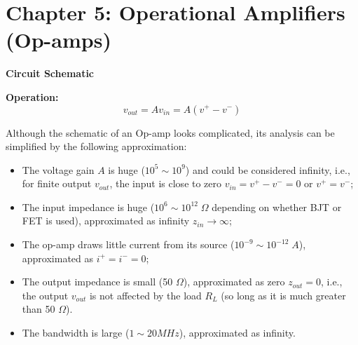 \usepackage{html}
\textwidth 6.0in
\topmargin -0.5in
\oddsidemargin -0in
\evensidemargin -0.5in


\section*{Chapter 5: Operational Amplifiers (Op-amps)}

{\bf Circuit Schematic}


{\bf Operation:}	
\[	v_{out}=A v_{in}=A (v^+ - v^-)	\]

Although the schematic of an Op-amp looks complicated, its 
analysis can be simplified by the following approximation:
\begin{itemize}
\item The voltage gain $A$ is huge ($10^5 \sim 10^9$) and could be considered
	infinity, i.e., for finite output $v_{out}$, the input is
	close to zero $v_{in}=v^+ - v^-=0$ or $v^+=v^-$;
\item The input impedance is huge ($10^6\sim 10^{12} \;\Omega$ depending
	on whether BJT or FET is used), approximated as infinity 
	$z_{in}\rightarrow \infty$;
\item The op-amp draws little current from its source 
	($10^{-9}\sim10^{-12}\;A$), approximated as $i^+=i^-=0$;
\item The output impedance is small (50 $\Omega$), approximated as 
	zero $z_{out}=0$, i.e., the output $v_{out}$ is not affected
	by the load $R_L$ (so long as it is much greater than 50 $\Omega$).
\item The bandwidth is large ($1 \sim 20MHz$), approximated as infinity.
\end{itemize}


